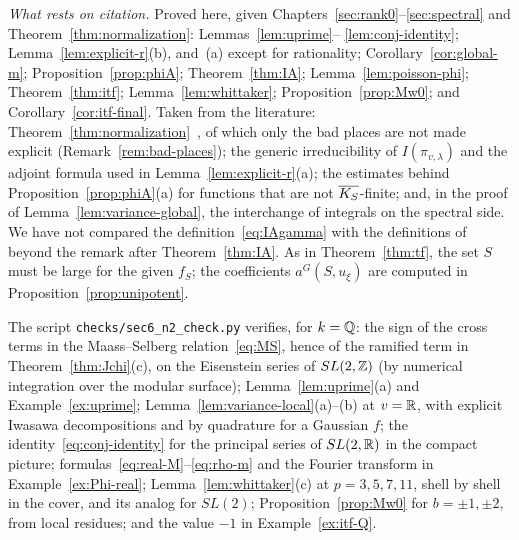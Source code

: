 \begin{remarkrev}\label{rem:sec6-status}
\emph{What rests on citation.} Proved here, given
Chapters~\ref{sec:rank0}--\ref{sec:spectral} and
Theorem~\ref{thm:normalization}: Lemmas~\ref{lem:uprime}--%
\ref{lem:conj-identity}; Lemma~\ref{lem:explicit-r}(b), and~(a) except
for rationality; Corollary~\ref{cor:global-m}; Proposition~\ref{prop:phiA};
Theorem~\ref{thm:IA}; Lemma~\ref{lem:poisson-phi}; Theorem~\ref{thm:itf};
Lemma~\ref{lem:whittaker}; Proposition~\ref{prop:Mw0}; and
Corollary~\ref{cor:itf-final}. Taken from the literature:
Theorem~\ref{thm:normalization}~\cite{Ar89,Li12a}, of which only the bad
places are not made explicit (Remark~\ref{rem:bad-places}); the generic
irreducibility of $I(\pi_{v,\lambda})$ and the adjoint formula used in
Lemma~\ref{lem:explicit-r}(a); the estimates behind
Proposition~\ref{prop:phiA}(a) for functions that are not $\overline{K_S}$-finite;
and, in the proof of Lemma~\ref{lem:variance-global}, the interchange of
integrals on the spectral side. We have not compared the
definition~\eqref{eq:IAgamma} with the definitions of~\cite{Li14b} beyond
the remark after Theorem~\ref{thm:IA}. As in
Theorem~\ref{thm:tf}, the set $S$ must be large for the given $f_S$; the
coefficients $a^G(S,u_\xi)$ are computed in
Proposition~\ref{prop:unipotent}.
\end{remarkrev}

\begin{remarkrev}\label{rem:verified-sec6}
The script \texttt{checks/sec6\_n2\_check.py} verifies, for $k=\mathbb{Q}$: the
sign of the cross terms in the Maass--Selberg relation~\eqref{eq:MS},
hence of the ramified term in Theorem~\ref{thm:Jchi}(c), on the
Eisenstein series of $SL(2,\mathbb{Z})$ (by numerical integration over the
modular surface); Lemma~\ref{lem:uprime}(a) and
Example~\ref{ex:uprime}; Lemma~\ref{lem:variance-local}(a)--(b) at
$v=\mathbb{R}$, with explicit Iwasawa decompositions and by quadrature for a
Gaussian $f$; the identity~\eqref{eq:conj-identity} for the principal
series of $SL(2,\mathbb{R})$ in the compact picture;
formulas~\eqref{eq:real-M}--\eqref{eq:rho-m} and the Fourier transform in
Example~\ref{ex:Phi-real}; Lemma~\ref{lem:whittaker}(c) at $p=3,5,7,11$,
shell by shell in the cover, and its analog for $SL(2)$;
Proposition~\ref{prop:Mw0} for $b=\pm1,\pm2$, from local residues; and the
value $-1$ in Example~\ref{ex:itf-Q}.
\end{remarkrev}
